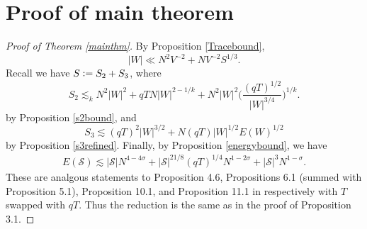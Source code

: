 \section{Proof of main theorem}
\begin{proof}[Proof of Theorem \ref{mainthm}]
    By Proposition \ref{Tracebound},
\[    |W|\ll N^2 V^{-2} + N V^{-2} S^{1/3}.\]
Recall we have $S\mathrel{\mathop:}= S_2+S_3$, where 
\[
    S_2 \lesssim_k N^2|W|^2 + qTN|W|^{2-1/k} + N^2|W|^2 \Big(\frac{(qT)^{1/2}}{|W|^{3/4}}\Big)^{1/k}.
\]
    by Proposition \ref{s2bound}, and
    \[
        S_3\lesssim (qT)^2|W|^{3/2} + N(qT)|W|^{1/2}E(W)^{1/2} 
    \]
    by Proposition \ref{s3refined}.
    Finally, by Proposition \ref{energybound}, we have
    \begin{align*}
E(\mathcal{S})\lesssim |\mathcal{S}|N^{4-4\sigma}+|\mathcal{S}|^{21/8}(qT)^{1/4}N^{1-2\sigma}+|\mathcal{S}|^3N^{1-\sigma}.
    \end{align*}
    These are analgous statements to Proposition 4.6, Propositions 6.1 (summed with Proposition 5.1), Proposition 10.1, and Proposition 11.1 in \cite{GM2024} respectively with 
    $T$ swapped with $qT$. Thus the reduction is the same as in the proof of Proposition 3.1.
\end{proof}